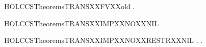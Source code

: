 \newcommand{\HOLCCSTheoremsTRANSXXFV}{\UseVerbatim{HOLCCSTheoremsTRANSXXFV}}
\begin{SaveVerbatim}{HOLCCSTheoremsTRANSXXFVXXold}
\HOLTokenTurnstile{} \HOLSymConst{\HOLTokenForall{}}  .  \HOLTokenTransBegin{}\HOLTokenTransEnd {} \HOLSymConst{\HOLTokenImp{}}   \HOLConst{\HOLTokenSubset{}}   \HOLConst{\HOLTokenUnion{}}  
\end{SaveVerbatim}
\newcommand{\HOLCCSTheoremsTRANSXXFVXXold}{\UseVerbatim{HOLCCSTheoremsTRANSXXFVXXold}}
\begin{SaveVerbatim}{HOLCCSTheoremsTRANSXXIMPXXNOXXNIL}
\HOLTokenTurnstile{} \HOLSymConst{\HOLTokenForall{}}  .  \HOLTokenTransBegin{}\HOLTokenTransEnd {} \HOLSymConst{\HOLTokenImp{}}  \HOLSymConst{\HOLTokenNotEqual{}} 
\end{SaveVerbatim}
\newcommand{\HOLCCSTheoremsTRANSXXIMPXXNOXXNIL}{\UseVerbatim{HOLCCSTheoremsTRANSXXIMPXXNOXXNIL}}
\begin{SaveVerbatim}{HOLCCSTheoremsTRANSXXIMPXXNOXXRESTRXXNIL}
\HOLTokenTurnstile{} \HOLSymConst{\HOLTokenForall{}}  .  \HOLTokenTransBegin{}\HOLTokenTransEnd {} \HOLSymConst{\HOLTokenImp{}} \HOLSymConst{\HOLTokenForall{}}.  \HOLSymConst{\HOLTokenNotEqual{}}   
\end{SaveVerbatim}
\newcommand{\HOLCCSTheoremsTRANSXXIMPXXNOXXRESTRXXNIL}{\UseVerbatim{HOLCCSTheoremsTRANSXXIMPXXNOXXRESTRXXNIL}}
